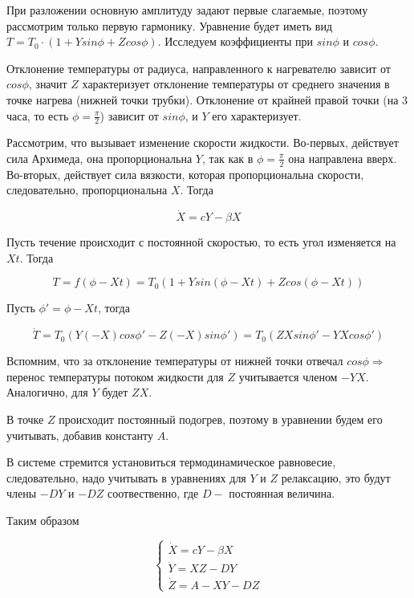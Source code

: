 \documentclass[12pt]{article}
\begin{document}
При разложении основную амплитуду задают первые слагаемые, поэтому рассмотрим только первую гармонику. Уравнение будет иметь вид $T = T_0 \cdot (1+Ysin\phi + Zcos\phi)$. Исследуем коэффициенты при $sin\phi$ и $cos\phi$.

Отклонение температуры от радиуса, направленного к нагревателю зависит от $cos \phi$, значит $Z$ характеризует отклонение температуры от среднего значения в точке нагрева (нижней точки трубки). Отклонение от крайней правой точки (на 3 часа, то есть $\phi = \frac{\pi}{2}$) зависит от $sin\phi$, и $Y$ его характеризует.

Рассмотрим, что вызывает изменение скорости жидкости. Во-первых, действует сила Архимеда, она пропорциональна $Y$, так как в $\phi=\frac{\pi}{2}$ она направлена вверх. Во-вторых, действует сила вязкости, которая пропорциональна скорости, следовательно, пропорциональна $X$. Тогда

\begin{equation}
	\dot{X} = cY-\beta X
\end{equation}

Пусть течение происходит с постоянной скоростью, то есть угол изменяется на $Xt$. Тогда

\begin{equation}
	T=f(\phi-Xt)=T_0(1+Ysin(\phi-Xt)+Zcos(\phi-Xt))
\end{equation}

Пусть $\phi'=\phi-Xt$, тогда

\begin{equation}
	\dot{T}=T_0(Y(-X)cos\phi'-Z(-X)sin\phi')=T_0(ZXsin\phi'-YXcos\phi')
\end{equation}

Вспомним, что за отклонение температуры от нижней точки отвечал $cos\phi \Longrightarrow$ перенос температуры потоком жидкости для $Z$ учитывается членом $-YX$. Аналогично, для $Y$ будет $ZX$.

В точке $Z$ происходит постоянный подогрев, поэтому в уравнении будем его учитывать, добавив константу $A$. 

В системе стремится установиться термодинамическое равновесие, следовательно, надо учитывать в уравнениях для $Y$ и $Z$ релаксацию, это будут члены $-DY$ и $-DZ$ соотвественно, где $D -$ постоянная величина.

Таким образом

$$\begin{cases}
	\dot{X} = cY-\beta X \\
	\dot{Y} = XZ-DY \\
	\dot{Z} = A-XY-DZ
\end{cases}$$
\end{document}
